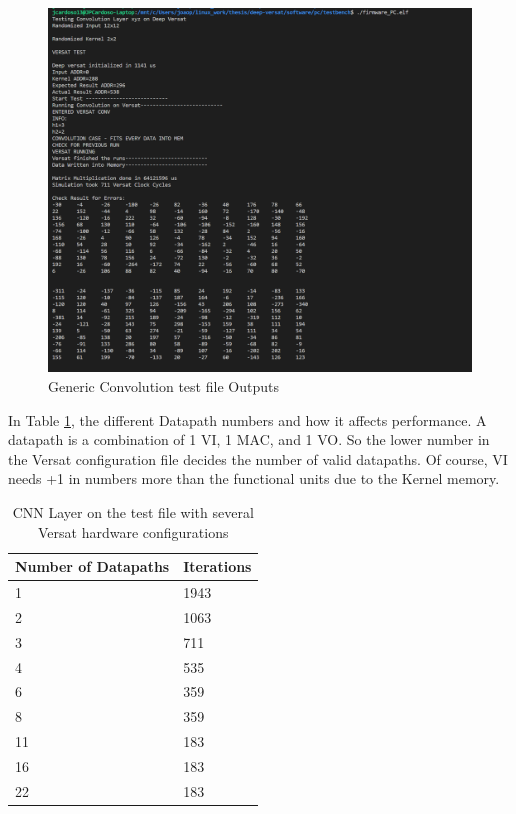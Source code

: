 \begin{figure}[!htbp]
    \centering
    \includegraphics[width=\textwidth]{Figures/test3.png}
    \caption{Generic Convolution test file Outputs}
    \label{figure:test3}
\end{figure}

In Table \ref{table:Iterations}, the different Datapath numbers and how it affects performance.
A datapath is a combination of 1 VI, 1 MAC, and 1 VO. So the lower number in the Versat configuration file
decides the number of valid datapaths. Of course, VI needs +1 in numbers more than the functional units due to the Kernel memory.
\newpage
\begin{table}[!htpb]
    \centering
    \begin{tabular}{ll}
    \hline
    \textbf{Number of Datapaths} &  \textbf{Iterations}        \\ \hline
    1          & 1943                 \\
	2          & 1063                 \\
	3          & 711                 \\
	4          & 535                 \\
	6          & 359                 \\
	8          & 359                 \\
	11          & 183                 \\
	16          & 183                 \\
    22            & 183                       \\  \hline
    \end{tabular}
    \label{table:Iterations}
    \caption{CNN Layer on the test file with several Versat hardware configurations}
\end{table}

